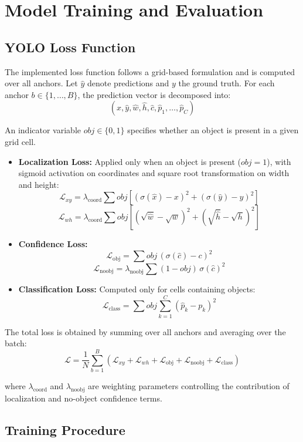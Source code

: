 \documentclass[10pt, a4paper]{article}
\begin{document}
\section{Model Training and Evaluation}
\subsection{YOLO Loss Function}

The implemented loss function follows a grid-based formulation and is computed over all anchors. Let $\hat{y}$ denote predictions and $y$ the ground truth. For each anchor $b \in \{1,\dots,B\}$, the prediction vector is decomposed into:
\[
(\hat{x}, \hat{y}, \hat{w}, \hat{h}, \hat{c}, \hat{p}_1, \dots, \hat{p}_C)
\]

An indicator variable $obj \in \{0,1\}$ specifies whether an object is present in a given grid cell.

\begin{itemize}
	\item \textbf{Localization Loss:} Applied only when an object is present ($obj = 1$), with sigmoid activation on coordinates and square root transformation on width and height:
	\[
	\mathcal{L}_{xy} = \lambda_{\text{coord}} \sum obj \left[ (\sigma(\hat{x}) - x)^2 + (\sigma(\hat{y}) - y)^2 \right]
	\]
	\[
	\mathcal{L}_{wh} = \lambda_{\text{coord}} \sum obj \left[ (\sqrt{\hat{w}} - \sqrt{w})^2 + (\sqrt{\hat{h}} - \sqrt{h})^2 \right]
	\]
	
	\item \textbf{Confidence Loss:}
	\[
	\mathcal{L}_{\text{obj}} = \sum obj \, (\sigma(\hat{c}) - c)^2
	\]
	\[
	\mathcal{L}_{\text{noobj}} = \lambda_{\text{noobj}} \sum (1 - obj)\, \sigma(\hat{c})^2
	\]
	
	\item \textbf{Classification Loss:} Computed only for cells containing objects:
	\[
	\mathcal{L}_{\text{class}} = \sum obj \sum_{k=1}^{C} (\hat{p}_k - p_k)^2
	\]
\end{itemize}

The total loss is obtained by summing over all anchors and averaging over the batch:
\[
\mathcal{L} = \frac{1}{N} \sum_{b=1}^{B} \left(
\mathcal{L}_{xy} + \mathcal{L}_{wh} + \mathcal{L}_{\text{obj}} + \mathcal{L}_{\text{noobj}} + \mathcal{L}_{\text{class}}
\right)
\]

where $\lambda_{\text{coord}}$ and $\lambda_{\text{noobj}}$ are weighting parameters controlling the contribution of localization and no-object confidence terms.
\subsection{Training Procedure}
\end{document}
